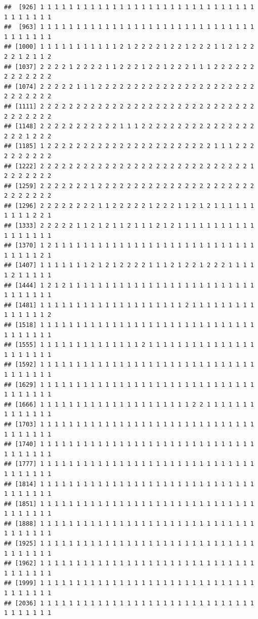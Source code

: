 \documentclass[
]{article}
\begin{document}
\begin{verbatim}
##  [926] 1 1 1 1 1 1 1 1 1 1 1 1 1 1 1 1 1 1 1 1 1 1 1 1 1 1 1 1 1 1 1 1 1 1 1 1 1
##  [963] 1 1 1 1 1 1 1 1 1 1 1 1 1 1 1 1 1 1 1 1 1 1 1 1 1 1 1 1 1 1 1 1 1 1 1 1 1
## [1000] 1 1 1 1 1 1 1 1 1 1 1 2 1 2 2 2 2 1 2 2 1 2 2 2 1 1 2 1 2 2 2 2 1 2 1 1 2
## [1037] 2 2 2 2 1 2 2 2 2 1 1 2 2 2 1 2 2 1 2 2 2 1 1 1 2 2 2 2 2 2 2 2 2 2 2 2 2
## [1074] 2 2 2 2 2 1 1 1 2 2 2 2 2 2 2 2 2 2 2 2 2 2 2 2 2 2 2 2 2 2 2 2 2 2 2 2 2
## [1111] 2 2 2 2 2 2 2 2 2 2 2 2 2 2 2 2 2 2 2 2 2 2 2 2 2 2 2 2 2 2 2 2 2 2 2 2 2
## [1148] 2 2 2 2 2 2 2 2 2 2 2 1 1 1 2 2 2 2 2 2 2 2 2 2 2 2 2 2 2 2 2 2 2 1 2 2 2
## [1185] 1 2 2 2 2 2 2 2 2 2 2 2 2 2 2 2 2 2 2 2 2 2 2 2 1 1 1 2 2 2 2 2 2 2 2 2 2
## [1222] 2 2 2 2 2 2 2 2 2 2 2 2 2 2 2 2 2 2 2 2 2 2 2 2 2 2 2 2 2 1 2 2 2 2 2 2 2
## [1259] 2 2 2 2 2 2 2 1 2 2 2 2 2 2 2 2 2 2 2 2 2 2 2 2 2 2 2 2 2 2 2 2 2 2 2 2 2
## [1296] 2 2 2 2 2 2 2 2 1 1 2 2 2 2 2 1 2 2 2 1 1 2 1 2 1 1 1 1 1 1 1 1 1 1 2 2 1
## [1333] 2 2 2 2 2 1 1 2 1 2 1 1 2 1 1 1 2 1 2 1 1 1 1 1 1 1 1 1 1 1 1 1 1 1 1 1 1
## [1370] 1 2 1 1 1 1 1 1 1 1 1 1 1 1 1 1 1 1 1 1 1 1 1 1 1 1 1 1 1 1 1 1 1 1 1 2 1
## [1407] 1 1 1 1 1 1 1 2 1 2 1 2 2 2 2 1 1 1 2 1 2 2 1 2 2 2 1 1 1 1 1 2 1 1 1 1 1
## [1444] 1 2 1 2 1 1 1 1 1 1 1 1 1 1 1 1 1 1 1 1 1 1 1 1 1 1 1 1 1 1 1 1 1 1 1 1 1
## [1481] 1 1 1 1 1 1 1 1 1 1 1 1 1 1 1 1 1 1 1 1 2 1 1 1 1 1 1 1 1 1 1 1 1 1 1 1 2
## [1518] 1 1 1 1 1 1 1 1 1 1 1 1 1 1 1 1 1 1 1 1 1 1 1 1 1 1 1 1 1 1 1 1 1 1 1 1 1
## [1555] 1 1 1 1 1 1 1 1 1 1 1 1 1 1 2 1 1 1 1 1 1 1 1 1 1 1 1 1 1 1 1 1 1 1 1 1 1
## [1592] 1 1 1 1 1 1 1 1 1 1 1 1 1 1 1 1 1 1 1 1 1 1 1 1 1 1 1 1 1 1 1 1 1 1 1 1 1
## [1629] 1 1 1 1 1 1 1 1 1 1 1 1 1 1 1 1 1 1 1 1 1 1 1 1 1 1 1 1 1 1 1 1 1 1 1 1 1
## [1666] 1 1 1 1 1 1 1 1 1 1 1 1 1 1 1 1 1 1 1 1 1 2 2 1 1 1 1 1 1 1 1 1 1 1 1 1 1
## [1703] 1 1 1 1 1 1 1 1 1 1 1 1 1 1 1 1 1 1 1 1 1 1 1 1 1 1 1 1 1 1 1 1 1 1 1 1 1
## [1740] 1 1 1 1 1 1 1 1 1 1 1 1 1 1 1 1 1 1 1 1 1 1 1 1 1 1 1 1 1 1 1 1 1 1 1 1 1
## [1777] 1 1 1 1 1 1 1 1 1 1 1 1 1 1 1 1 1 1 1 1 1 1 1 1 1 1 1 1 1 1 1 1 1 1 1 1 1
## [1814] 1 1 1 1 1 1 1 1 1 1 1 1 1 1 1 1 1 1 1 1 1 1 1 1 1 1 1 1 1 1 1 1 1 1 1 1 1
## [1851] 1 1 1 1 1 1 1 1 1 1 1 1 1 1 1 1 1 1 1 1 1 1 1 1 1 1 1 1 1 1 1 1 1 1 1 1 1
## [1888] 1 1 1 1 1 1 1 1 1 1 1 1 1 1 1 1 1 1 1 1 1 1 1 1 1 1 1 1 1 1 1 1 1 1 1 1 1
## [1925] 1 1 1 1 1 1 1 1 1 1 1 1 1 1 1 1 1 1 1 1 1 1 1 1 1 1 1 1 1 1 1 1 1 1 1 1 1
## [1962] 1 1 1 1 1 1 1 1 1 1 1 1 1 1 1 1 1 1 1 1 1 1 1 1 1 1 1 1 1 1 1 1 1 1 1 1 1
## [1999] 1 1 1 1 1 1 1 1 1 1 1 1 1 1 1 1 1 1 1 1 1 1 1 1 1 1 1 1 1 1 1 1 1 1 1 1 1
## [2036] 1 1 1 1 1 1 1 1 1 1 1 1 1 1 1 1 1 1 1 1 1 1 1 1 1 1 1 1 1 1 1 1 1 1 1 1 1

\end{verbatim}
\end{document}
